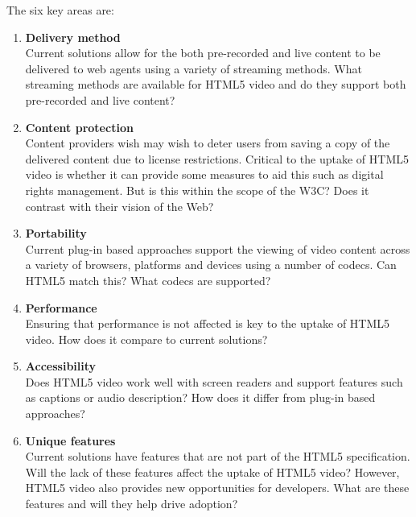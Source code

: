 \documentclass[a4paper]{article}
\begin{document}
The six key areas are:
\begin{enumerate}
\item \textbf{Delivery method} \\
Current solutions allow for the both pre-recorded and live content to be delivered to web agents using a variety of streaming methods. What streaming methods are available for HTML5 video and do they support both pre-recorded and live content?
\item \textbf{Content protection} \\
Content providers wish may wish to deter users from saving a copy of the delivered content due to license restrictions. Critical to the uptake of HTML5 video is whether it can provide some measures to aid this such as digital rights management. But is this within the scope of the W3C? Does it contrast with their vision of the Web? 
\item \textbf{Portability} \\
Current plug-in based approaches support the viewing of video content across a variety of browsers, platforms and devices using a number of codecs. Can HTML5 match this? What codecs are supported?
\item \textbf{Performance} \\
Ensuring that performance is not affected is key to the uptake of HTML5 video. How does it compare to current solutions?
\item \textbf{Accessibility} \\
Does HTML5 video work well with screen readers and support features such as captions or audio description? How does it differ from plug-in based approaches?
\item \textbf{Unique features} \\
Current solutions have features that are not part of the HTML5 specification. Will the lack of these features affect the uptake of HTML5 video? However, HTML5 video also provides new opportunities for developers. What are these features and will they help drive adoption?
\end{enumerate}
\end{document}
